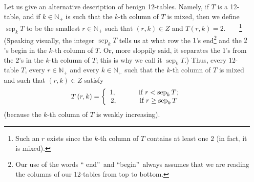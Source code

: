 \documentclass[numbers=enddot,12pt,final,onecolumn,notitlepage]{scrartcl}%
\theoremstyle{definition}
\begin{document}
Let us give an alternative description of benign 12-tables. Namely, if $T$ is
a 12-table, and if $k\in\mathbb{N}_{+}$ is such that the $k$-th column of $T$
is mixed, then we define $\operatorname*{sep}\nolimits_{k}T$ to be the
smallest $r\in\mathbb{N}_{+}$ such that $\left(  r,k\right)  \in Z$ and
$T\left(  r,k\right)  =2$.\ \ \ \ \footnote{Such an $r$ exists since the
$k$-th column of $T$ contains at least one $2$ (in fact, it is mixed).}
(Speaking visually, the integer $\operatorname*{sep}\nolimits_{k}T$ tells us
at what row the $1$'s end\footnote{Our use of the words \textquotedblleft
end\textquotedblright\ and \textquotedblleft begin\textquotedblright\ always
assumes that we are reading the columns of our 12-tables from top to bottom.}
and the $2$'s begin in the $k$-th column of $T$. Or, more sloppily said, it
separates the $1$'s from the $2$'s in the $k$-th column of $T$; this is why we
call it $\operatorname*{sep}\nolimits_{k}T$.) Thus, every 12-table $T$, every
$r\in\mathbb{N}_{+}$ and every $k\in\mathbb{N}_{+}$ such that the $k$-th
column of $T$ is mixed and such that $\left(  r,k\right)  \in Z$ satisfy%
\begin{equation}
T\left(  r,k\right)  =\left\{
\begin{array}
[c]{c}%
1,\ \ \ \ \ \ \ \ \ \ \text{if }r<\operatorname*{sep}\nolimits_{k}T;\\
2,\ \ \ \ \ \ \ \ \ \ \text{if }r\geq\operatorname*{sep}\nolimits_{k}T
\end{array}
\right.  \label{pf.lem.BK.Tsep}%
\end{equation}
(because the $k$-th column of $T$ is weakly increasing).
\end{document}
